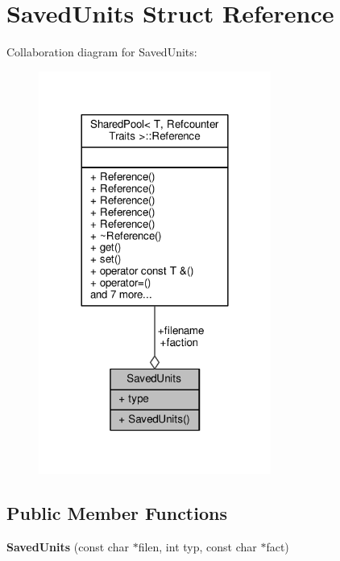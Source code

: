 \hypertarget{structSavedUnits}{}\section{Saved\+Units Struct Reference}
\label{structSavedUnits}


Collaboration diagram for Saved\+Units\+:
\nopagebreak
\begin{figure}[H]
\begin{center}
\leavevmode
\includegraphics[width=216pt]{d9/d7e/structSavedUnits__coll__graph}
\end{center}
\end{figure}
\subsection*{Public Member Functions}
\begin{DoxyCompactItemize}
\item 
{\bfseries Saved\+Units} (const char $\ast$filen, int typ, const char $\ast$fact)\hypertarget{structSavedUnits_a1d7f12e48b6e75be38b7cad04201400f}{}\label{structSavedUnits_a1d7f12e48b6e75be38b7cad04201400f}

\end{DoxyCompactItemize}
